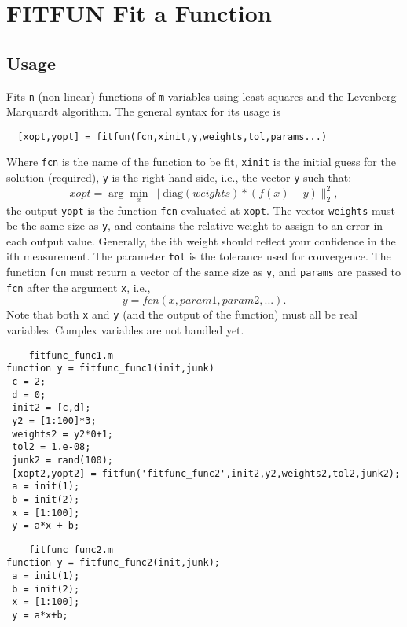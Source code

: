 \section{FITFUN Fit a Function}

\subsection{Usage}

Fits \verb|n| (non-linear) functions of \verb|m| variables using least squares
and the Levenberg-Marquardt algorithm.  The general syntax for its usage
is
\begin{verbatim}
  [xopt,yopt] = fitfun(fcn,xinit,y,weights,tol,params...)
\end{verbatim}
Where \verb|fcn| is the name of the function to be fit, \verb|xinit| is the
initial guess for the solution (required), \verb|y| is the right hand side,
i.e., the vector \verb|y| such that:
\[
   xopt = \arg \min_{x} \|\mathrm{diag}(weights)*(f(x) - y)\|_2^2,
\]
the output \verb|yopt| is the function \verb|fcn| evaluated at \verb|xopt|.  
The vector \verb|weights| must be the same size as \verb|y|, and contains the
relative weight to assign to an error in each output value.  Generally,
the ith weight should reflect your confidence in the ith measurement.
The parameter \verb|tol| is the tolerance used for convergence.
The function \verb|fcn| must return a vector of the same size as \verb|y|,
and \verb|params| are passed to \verb|fcn| after the argument \verb|x|, i.e.,
\[
  y = fcn(x,param1,param2,...).
\]
Note that both \verb|x| and \verb|y| (and the output of the function) must all
be real variables.  Complex variables are not handled yet.
\begin{verbatim}
    fitfunc_func1.m
function y = fitfunc_func1(init,junk)
 c = 2;
 d = 0;
 init2 = [c,d];
 y2 = [1:100]*3;
 weights2 = y2*0+1;
 tol2 = 1.e-08;
 junk2 = rand(100);
 [xopt2,yopt2] = fitfun('fitfunc_func2',init2,y2,weights2,tol2,junk2);
 a = init(1);
 b = init(2);
 x = [1:100];
 y = a*x + b;
\end{verbatim}
\begin{verbatim}
    fitfunc_func2.m
function y = fitfunc_func2(init,junk);
 a = init(1);
 b = init(2);
 x = [1:100];
 y = a*x+b;
\end{verbatim}
